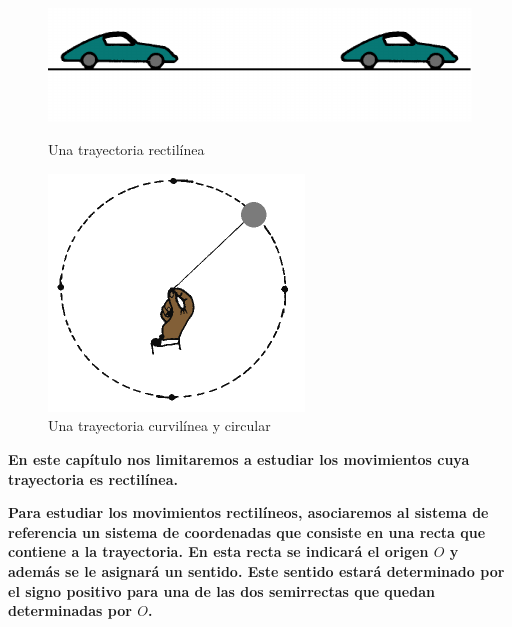 \begin{figure}[!h]
\centering
\begin{minipage}{.55\textwidth}
  \includegraphics[width=\textwidth]{img/tray_rect.pdf}
  \caption{Una trayectoria rectilínea}
\end{minipage}%
\hfill
\begin{minipage}{.4\textwidth}
  \includegraphics[width=\textwidth]{img/tray_curv.pdf}
  \caption{Una trayectoria curvilínea y circular}
\end{minipage}
\end{figure}

{\color{NavyBlue} \bf En este capítulo nos limitaremos a estudiar los movimientos cuya trayectoria es rectilínea.}

{\bf Para estudiar los movimientos rectilíneos, asociaremos al sistema de referencia un sistema de coordenadas que consiste en una recta que contiene a la trayectoria. En esta recta se indicará el origen $O$ y además se le asignará un sentido. Este sentido estará determinado por el signo positivo para una de las dos semirrectas que quedan determinadas por $O$.}
